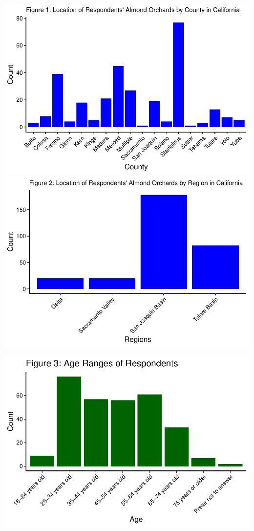 \documentclass[12pt,]{article}
\begin{document}
\includegraphics{Project_Template_files/figure-latex/location plots-1.pdf}
\includegraphics{Project_Template_files/figure-latex/location plots-2.pdf}

\includegraphics{Project_Template_files/figure-latex/respondent age-1.pdf}
\end{document}

